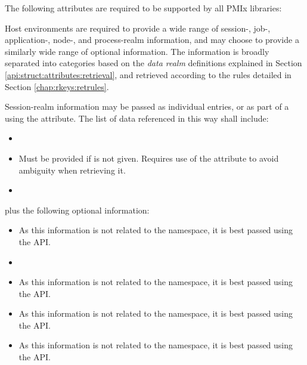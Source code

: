 \reqattrstart
The following attributes are required to be supported by all \ac{PMIx} libraries:


\divider

Host environments are required to provide a wide range of session-, job-, application-, node-, and process-realm information, and may choose to provide a similarly wide range of optional information. The information is broadly separated into categories based on the \emph{data realm} definitions explained in Section \ref{api:struct:attributes:retrieval}, and retrieved according to the rules detailed in Section \ref{chap:rkeys:retrules}.

Session-realm information may be passed as individual  entries, or as part of a  using the  attribute. The list of data referenced in this way shall include:

\begin{itemize}
    \item {}
    \item {}Must be provided if  is not given. Requires use of the  attribute to avoid ambiguity when retrieving it.
    \pasteAttributeItemEnd
    \item {}
\end{itemize}

plus the following optional information:

\begin{itemize}
    \item {}As this information is not related to the namespace, it is best passed using the  \ac{API}.
    \pasteAttributeItemEnd
    \item {}
    \item {}As this information is not related to the namespace, it is best passed using the  \ac{API}.
    \pasteAttributeItemEnd
    \item {}As this information is not related to the namespace, it is best passed using the  \ac{API}.
    \pasteAttributeItemEnd
    \item {}As this information is not related to the namespace, it is best passed using the  \ac{API}.
    \pasteAttributeItemEnd
\end{itemize}

